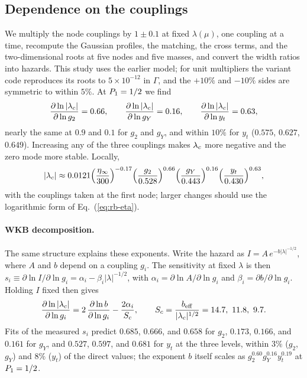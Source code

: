 \subsection{Dependence on the couplings}
\label{sec:rb-couplings}

We multiply the node couplings by $1\pm0.1$ at fixed $\lambda(\mu)$, one coupling at a time, recompute the Gaussian profiles, the matching, the cross terms, and the two-dimensional roots at five nodes and five masses, and convert the width ratios into hazards.
This study uses the earlier model; for unit multipliers the variant code reproduces its roots to $5\times10^{-12}$ in $\Gamma$, and the $+10\%$ and $-10\%$ sides are symmetric to within $5\%$. %
At $P_1=1/2$ we find
\begin{equation}
\frac{\partial\ln|\lamc|}{\partial\ln g_2}=0.66,\qquad \frac{\partial\ln|\lamc|}{\partial\ln g_Y}=0.16,\qquad \frac{\partial\ln|\lamc|}{\partial\ln y_t}=0.63, %
\label{eq:rb-coupderiv}
\end{equation}
nearly the same at $0.9$ and $0.1$ for $g_2$ and $g_Y$, and within $10\%$ for $y_t$ ($0.575$, $0.627$, $0.649$). %
Increasing any of the three couplings makes $\lambda_c$ more negative and the zero mode more stable.
Locally,
\begin{equation}
|\lamc|\approx0.0121\Bigl(\frac{\eta_\infty}{300}\Bigr)^{-0.17}\Bigl(\frac{g_2}{0.528}\Bigr)^{0.66}\Bigl(\frac{g_Y}{0.443}\Bigr)^{0.16}\Bigl(\frac{y_t}{0.430}\Bigr)^{0.63}, %
\label{eq:rb-powerlaw}
\end{equation}
with the couplings taken at the first node; larger changes should use the logarithmic form of Eq.~(\ref{eq:rb-eta}).

\paragraph{WKB decomposition.}
The same structure explains these exponents.
Write the hazard as $I=A\,e^{-b|\lambda|^{-1/2}}$, where $A$ and $b$ depend on a coupling $g_i$.
The sensitivity at fixed $\lambda$ is then $s_i\equiv\partial\ln I/\partial\ln g_i=\alpha_i-\beta_i|\lambda|^{-1/2}$, with $\alpha_i=\partial\ln A/\partial\ln g_i$ and $\beta_i=\partial b/\partial\ln g_i$.
Holding $I$ fixed then gives
\begin{equation}
\frac{\partial\ln|\lamc|}{\partial\ln g_i}=2\,\frac{\partial\ln b}{\partial\ln g_i}-\frac{2\alpha_i}{S_c},\qquad S_c=\frac{b_{\rm eff}}{|\lamc|^{1/2}}=14.7,\ 11.8,\ 9.7 . %
\label{eq:rb-wkb-decomp}
\end{equation}
Fits of the measured $s_i$ predict $0.685$, $0.666$, and $0.658$ for $g_2$, $0.173$, $0.166$, and $0.161$ for $g_Y$, and $0.527$, $0.597$, and $0.681$ for $y_t$ at the three levels, within $3\%$ ($g_2$, $g_Y$) and $8\%$ ($y_t$) of the direct values; the exponent $b$ itself scales as $g_2^{0.60}g_Y^{0.16}y_t^{0.19}$ at $P_1=1/2$. %

